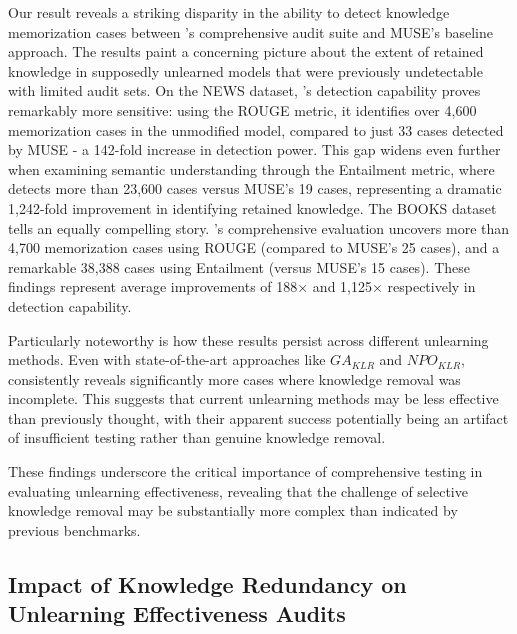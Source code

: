 Our result reveals a striking disparity in the ability to detect knowledge memorization cases between \sys's comprehensive audit suite and MUSE's baseline approach. The results paint a concerning picture about the extent of retained knowledge in supposedly unlearned models that were previously undetectable with limited audit sets.
On the NEWS dataset, \sys's detection capability proves remarkably more sensitive: using the ROUGE metric, it identifies over 4,600 memorization cases in the unmodified model, compared to just 33 cases detected by MUSE - a 142-fold increase in detection power. This gap widens even further when examining semantic understanding through the Entailment metric, where \sys detects more than 23,600 cases versus MUSE's 19 cases, representing a dramatic 1,242-fold improvement in identifying retained knowledge.
The BOOKS dataset tells an equally compelling story. \sys's comprehensive evaluation uncovers more than 4,700 memorization cases using ROUGE (compared to MUSE's 25 cases), and a remarkable 38,388 cases using Entailment (versus MUSE's 15 cases). These findings represent average improvements of 188× and 1,125× respectively in detection capability.

Particularly noteworthy is how these results persist across different unlearning methods. Even with state-of-the-art approaches like \(GA_{KLR}\) and \(NPO_{KLR}\), \sys consistently reveals significantly more cases where knowledge removal was incomplete.
This suggests that current unlearning methods may be less effective than previously thought, with their apparent success potentially being an artifact of insufficient testing rather than genuine knowledge removal.

These findings underscore the critical importance of comprehensive testing in evaluating unlearning effectiveness, revealing that the challenge of selective knowledge removal may be substantially more complex than indicated by previous benchmarks.

\subsection{Impact of Knowledge Redundancy on Unlearning Effectiveness Audits}
\label{sec:exp_conflict}



